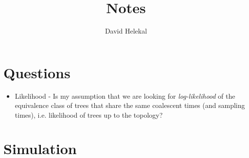 \documentclass{article}
\title{Notes}
\author{David Helekal}
\theoremstyle{definition}
\begin{document}
\maketitle
\newpage
\tableofcontents
\newpage
\section{Questions}
\begin{itemize}
  \item Likelihood - Is my assumption that we are looking for \textit{log-likelihood} of the equivalence class of trees that share the same coalescent times (and sampling times), i.e. likelihood of trees up to the topology?
\end{itemize}
\section{Simulation}
\end{document}
